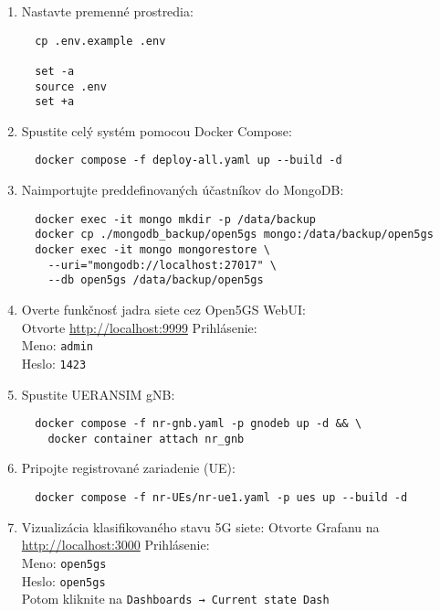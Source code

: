 \begin{refsegment}
\begin{enumerate}
  \item Nastavte premenné prostredia:
  \begin{verbatim}
  cp .env.example .env

  set -a
  source .env
  set +a
  \end{verbatim}

  \item Spustite celý systém pomocou Docker Compose:
  \begin{verbatim}
  docker compose -f deploy-all.yaml up --build -d
  \end{verbatim}

  \item Naimportujte preddefinovaných účastníkov do MongoDB:
  \begin{verbatim}
  docker exec -it mongo mkdir -p /data/backup
  docker cp ./mongodb_backup/open5gs mongo:/data/backup/open5gs
  docker exec -it mongo mongorestore \ 
    --uri="mongodb://localhost:27017" \
    --db open5gs /data/backup/open5gs
  \end{verbatim}

  \item Overte funkčnosť jadra siete cez Open5GS WebUI: \\ 
  Otvorte \url{http://localhost:9999}  
  Prihlásenie: \\ Meno: \texttt{admin} \\ Heslo: \texttt{1423}

  \item Spustite UERANSIM gNB:
  \begin{verbatim}
  docker compose -f nr-gnb.yaml -p gnodeb up -d && \
    docker container attach nr_gnb
  \end{verbatim}

  \item Pripojte registrované zariadenie (UE):
  \begin{verbatim}
  docker compose -f nr-UEs/nr-ue1.yaml -p ues up --build -d
  \end{verbatim}

  \item Vizualizácia klasifikovaného stavu 5G siete:  
  Otvorte Grafanu na \url{http://localhost:3000}  
  Prihlásenie:\\ Meno: \texttt{open5gs} \\ Heslo: \texttt{open5gs}  
  \\Potom kliknite na \texttt{Dashboards → Current state Dash}
\end{enumerate}

\printbibliography[heading=referencessec,segment=\therefsegment,resetnumbers=true]

\end{refsegment}